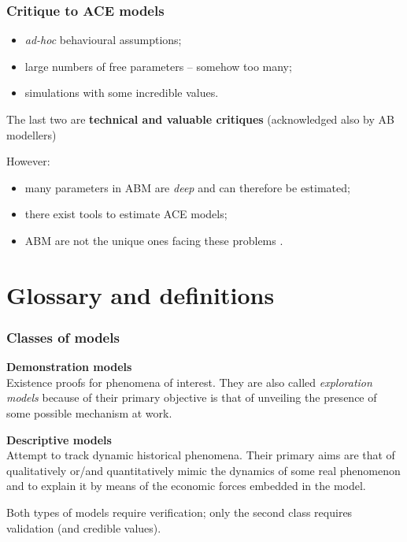 \documentclass[10pt]{beamer}
\begin{document}
\begin{frame}[c]\frametitle{Critique to ACE models}
	\begin{itemize}
		\item \emph{ad-hoc} behavioural assumptions;
		\item large numbers of free parameters -- somehow too many;
		\item simulations with some incredible values.
	\end{itemize} \bigskip
	
	The last two are \alert{\textbf{technical and valuable critiques}} (acknowledged also by AB modellers) \bigskip

	However:
	\begin{itemize}
		\item many parameters in ABM are \emph{deep} and can therefore be estimated; %
		\item there exist tools to estimate ACE models; %
		\item ABM are not the unique ones facing these problems \citep{fagiolo2017redux}. %
	\end{itemize} \bigskip

\end{frame}


\section{Glossary and definitions}


\begin{frame}[c]\frametitle{Classes of models}
	\alert{\textbf{Demonstration models}} 
	\\ Existence proofs for phenomena of interest. They are also called \emph{exploration models} because of their primary objective is that of unveiling the presence of some possible mechanism at work. \bigskip

	\alert{\textbf{Descriptive models}} 
	\\ Attempt to track dynamic historical phenomena. Their primary aims are that of qualitatively or/and quantitatively mimic the dynamics of some real phenomenon and to explain it by means of the economic forces embedded in the model.

	Both types of models require verification; only the second class requires validation (and credible values).
\end{frame}
\end{document}
